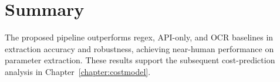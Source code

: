 \section{Summary}
The proposed pipeline outperforms regex, API-only, and OCR baselines in extraction accuracy and robustness, achieving near-human performance on parameter extraction. These results support the subsequent cost-prediction analysis in Chapter~\ref{chapter:costmodel}.